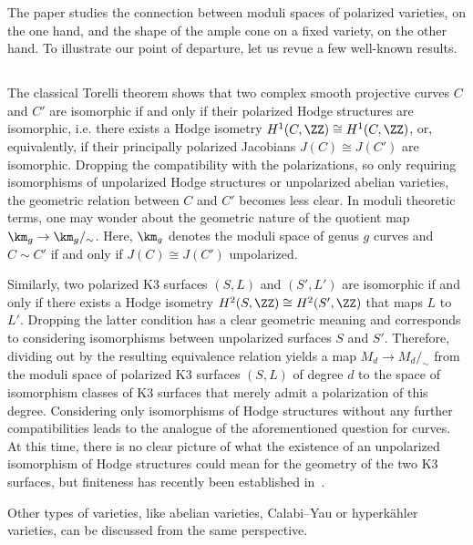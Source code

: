 The paper studies the connection between moduli spaces of polarized varieties, on the one hand, and the shape of the ample cone on a fixed variety, on the other hand. To illustrate our point of departure, let us revue a few well-known results.

\subsection{}
The classical Torelli theorem shows that two complex smooth projective curves $C$ and $C'$ are isomorphic if and only if their polarized Hodge structures are isomorphic, i.e. there exists a Hodge isometry $H^1(C,\ZZ)\cong H^1(C,\ZZ)$, or, equivalently, if their principally polarized Jacobians $J(C)\cong J(C')$ are isomorphic. Dropping the compatibility with the polarizations, so only requiring isomorphisms of unpolarized Hodge structures or unpolarized abelian varieties, the geometric relation between $C$ and $C'$ becomes less clear. In moduli theoretic terms, one may wonder about the geometric nature of the quotient map $\km_g\to\km_g/_\sim$. Here, $\km_g$ denotes the moduli space of genus $g$ curves and $C\sim C'$ if and only if $J(C)\cong J(C')$ unpolarized.

Similarly, two polarized K3 surfaces $(S,L)$ and $(S',L')$ are isomorphic if and only if there exists a Hodge isometry $H^2(S,\ZZ)\cong H^2(S',\ZZ)$ that maps $L$ to $L'$. Dropping the latter condition has a clear geometric meaning and corresponds to considering isomorphisms between unpolarized surfaces $S$ and $S'$. Therefore, dividing out by the resulting equivalence relation yields a map $M_d\to M_d/_\sim$ from the moduli space of polarized K3 surfaces $(S,L)$ of degree $d$ to the space of isomorphism classes of K3 surfaces that merely admit a polarization of this degree. Considering only isomorphisms of Hodge structures without any further compatibilities leads to the analogue of the aforementioned question for curves. At this time, there is no clear picture of what the existence of an unpolarized isomorphism of Hodge structures could mean for the geometry of the two K3 surfaces, but finiteness has recently been established in~\cite{Ef}.

Other types of varieties, like abelian varieties, Calabi--Yau or hyperk\"ahler varieties, can be discussed from the same perspective.

